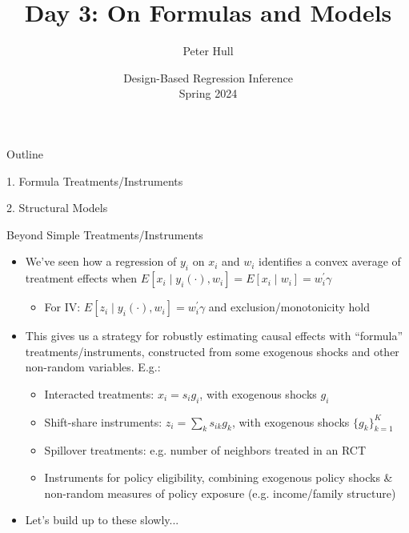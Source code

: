 \documentclass[11pt,english]{beamer}
\begin{document}
\begin{frame}[noframenumbering]{}
\vspace{0.5cm}
\title[]{Day 3: On Formulas and Models}
\author{Peter Hull}
\date{Design-Based Regression Inference \\Spring 2024} 
\titlepage {\small{}\ }\thispagestyle{empty} \vspace{-30pt}

\end{frame}
 

\begin{frame}{Outline}

1. Formula Treatments/Instruments
\vspace{0.8cm}

2. Structural Models

\end{frame}

\begin{frame}{Beyond Simple Treatments/Instruments}

\begin{itemize}
\item We've seen how a regression of $y_i$ on $x_i$ and $w_i$ identifies a convex average of treatment effects when $E[x_i\mid y_i(\cdot),w_i]=E[x_i\mid w_i]=w_i^\prime\gamma$\smallskip
\begin{itemize}
\item For IV: $E[z_i\mid y_i(\cdot),w_i]=w_i^\prime\gamma$ and exclusion/monotonicity hold
\end{itemize}\bigskip\pause{}
\item This gives us a strategy for robustly estimating causal effects with ``formula'' treatments/instruments, constructed from some exogenous shocks and other non-random variables\pause{}. E.g.: \smallskip
\begin{itemize}
\item Interacted treatments: $x_i=s_ig_i$, with exogenous shocks $g_i$\smallskip\pause{}
\item Shift-share instruments: $z_i=\sum_k s_{ik} g_k$, with exogenous shocks $\{g_k\}_{k=1}^K$\smallskip\pause{}
\item Spillover treatments: e.g. number of neighbors treated in an RCT\smallskip\pause{}
\item Instruments for policy eligibility, combining exogenous policy shocks \& non-random measures of policy exposure (e.g. income/family structure)
\end{itemize}\bigskip\pause{}
\item Let's build up to these slowly...
\end{itemize}

\end{frame}
\end{document}
